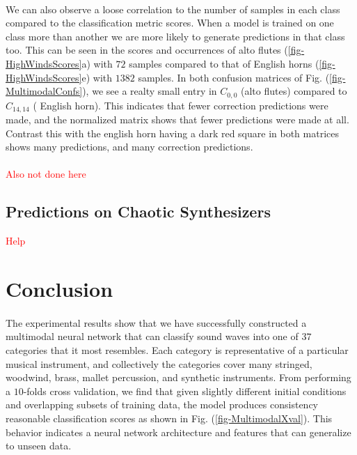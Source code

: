 \documentclass[12pt,letterpaper]{article}
\begin{document}
\paragraph*{}We can also observe a loose correlation to the number of samples in each class compared to the classification metric scores. When a model is trained on one class more than another we are more likely to generate predictions in that class too. This can be seen in the scores and occurrences of alto flutes (\ref{fig-HighWindsScores}a) with $72$ samples compared to that of English horns (\ref{fig-HighWindsScores}e) with $1382$ samples. In both confusion matrices of Fig. (\ref{fig-MultimodalConfs}), we see a realty small entry in $C_{0,0}$ (alto flutes) compared to $C_{14,14}$ ( English horn). This indicates that fewer correction predictions were made, and the normalized matrix shows that fewer predictions were made at all. Contrast this with the english horn having a dark red square in both matrices shows many predictions, and many correction predictions. 


\paragraph*{}
\textcolor{red}{Also not done here}


\subsection{Predictions on Chaotic Synthesizers}

\textcolor{red}{Help}



\newpage
\section{Conclusion}
\label{sec-Conclusion}

\paragraph*{}The experimental results show that we have successfully constructed a multimodal neural network that can classify sound waves into one of $37$ categories that it most resembles. Each category is representative of a particular musical instrument, and collectively the categories cover many stringed, woodwind, brass, mallet percussion, and synthetic instruments. From performing a $10$-folds cross validation, we find that given slightly different initial conditions and overlapping subsets of training data, the model produces consistency reasonable classification scores as shown in Fig. (\ref{fig-MultimodalXval}). This behavior indicates a neural network architecture and features that can generalize to unseen data.
\end{document}
